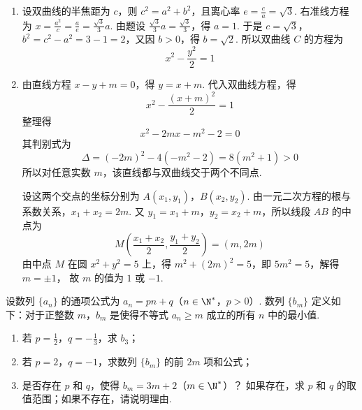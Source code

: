 \begin{solution}
\begin{enumerate}
\item 设双曲线的半焦距为 \(c\)，则 \(c^2=a^2+b^2\)，且离心率 \(e=\frac{c}{a}=\sqrt{3}\).
右准线方程为 \(x=\frac{a^2}{c}=\frac{a}{e}=\frac{\sqrt{3}}{3}a\).
由题设 \(\frac{\sqrt{3}}{3}a=\frac{\sqrt{3}}{3}\)，得 \(a=1\).
于是 \(c=\sqrt{3}\)，\(b^2=c^2-a^2=3-1=2\)，又因 \(b>0\)，得 \(b=\sqrt{2}\).
所以双曲线 \(C\) 的方程为
\[
x^2-\frac{y^2}{2}=1
\]

\item 由直线方程 \(x-y+m=0\)，得 \(y=x+m\).
代入双曲线方程，得
\[
x^2-\frac{(x+m)^2}{2}=1
\]
整理得
\[
x^2-2mx-m^2-2=0
\]
其判别式为
\[
\Delta=(-2m)^2-4(-m^2-2)=8(m^2+1)>0
\]
所以对任意实数 \(m\)，该直线都与双曲线交于两个不同点.

设这两个交点的坐标分别为 \(A(x_1,y_1)\)，\(B(x_2,y_2)\).
由一元二次方程的根与系数关系，\(x_1+x_2=2m\).
又 \(y_1=x_1+m\)，\(y_2=x_2+m\)，所以线段 \(AB\) 的中点为
\[
M\left(\frac{x_1+x_2}{2},\frac{y_1+y_2}{2}\right)=\left(m,2m\right)
\]
由中点 \(M\) 在圆 \(x^2+y^2=5\) 上，得
\(m^2+(2m)^2=5\)，即 \(5m^2=5\)，解得 \(m=\pm1\)，
故 \(m\) 的值为 \(1\) 或 \(-1\).
\end{enumerate}
\end{solution}

\begin{problem}
设数列 \(\{a_{n}\}\) 的通项公式为 \(a_{n} = pn + q\)（\(n \in \N^{*}\)，\(p > 0\)）. 数列 \(\{b_{m}\}\) 定义如下：对于正整数 \(m\)，\(b_{m}\) 是使得不等式 \(a_{n} \geqslant m\) 成立的所有 \(n\) 中的最小值.
\begin{enumerate}
\item 若 \(p = \frac{1}{2}\)，\(q = -\frac{1}{3}\)，求 \(b_{3}\)；
\item 若 \(p = 2\)，\(q = -1\)，求数列 \(\{b_m\}\) 的前 \(2m\) 项和公式；
\item 是否存在 \(p\) 和 \(q\)，使得 \(b_{m} = 3m + 2\)（\(m \in \N^{*}\)）？ 如果存在，求 \(p\) 和 \(q\) 的取值范围；如果不存在，请说明理由.
\end{enumerate}

\end{problem}

